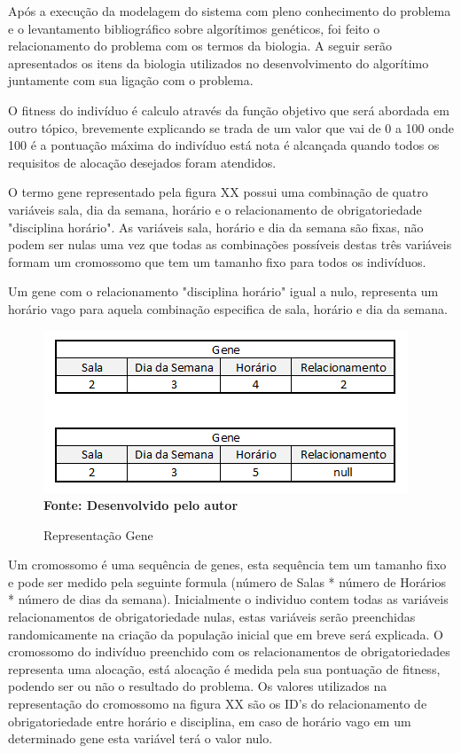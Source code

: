 
Após a execução da modelagem do sistema com pleno conhecimento do problema e o levantamento bibliográfico sobre algorítimos genéticos, foi feito o relacionamento do problema com os termos da biologia. A seguir serão apresentados os itens da biologia utilizados no desenvolvimento do algorítimo juntamente com sua ligação com o problema.\par


O fitness do indivíduo é calculo através da função objetivo que será abordada em outro tópico, brevemente explicando se trada de um valor que vai de 0 a 100 onde 100 é a pontuação máxima do indivíduo está nota é alcançada quando todos os requisitos de alocação desejados foram atendidos.

O termo gene representado pela figura XX possui uma combinação de quatro variáveis sala, dia da semana, horário e o relacionamento de obrigatoriedade 
"disciplina horário". As variáveis sala, horário e dia da semana são fixas, não podem ser nulas uma vez que todas as combinações possíveis destas três variáveis formam um cromossomo que tem um tamanho fixo para todos os indivíduos. \par

Um gene com o relacionamento "disciplina horário" igual a nulo, representa um horário vago para aquela combinação especifica de sala, horário e dia da semana.\par

\begin{figure}[!htb]
\caption[Representação Gene]{Representação Gene}
\label{fig:figura5}
\centering
\includegraphics[scale=0.7]{imagens/representacaoGene.png}
\\ \textbf{\footnotesize Fonte: Desenvolvido pelo autor}
\end{figure}

Um cromossomo é uma sequência de genes, esta sequência tem um tamanho fixo e pode ser medido pela seguinte formula (número de Salas * número de Horários * número de dias da semana). Inicialmente o individuo contem todas as variáveis relacionamentos de obrigatoriedade nulas, estas variáveis serão preenchidas randomicamente na criação da população inicial que em breve será explicada. O cromossomo do indivíduo preenchido com os relacionamentos de obrigatoriedades representa uma alocação, está alocação é medida pela sua pontuação de fitness, podendo ser ou não o resultado do problema. Os valores utilizados na representação do cromossomo na figura XX são os ID's do relacionamento de obrigatoriedade entre horário e disciplina, em caso de horário vago em um determinado gene esta variável terá o valor nulo.\par

